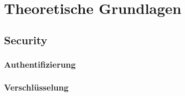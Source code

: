\chapter{Theoretische Grundlagen}
\section{Security}\label{sec:security}
\subsection{Authentifizierung}
\subsection{Verschlüsselung}

